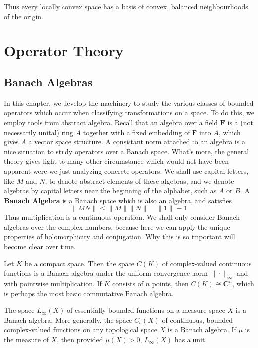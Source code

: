 Thus every locally convex space has a basis of convex, balanced neighbourhoods of the origin.




\part{Operator Theory}





\chapter{Banach Algebras}

In this chapter, we develop the machinery to study the various classes of bounded operators which occur when classifying transformations on a space. To do this, we employ tools from abstract algebra. Recall that an algebra over a field $\mathbf{F}$ is a (not necessarily unital) ring $A$ together with a fixed embedding of $\mathbf{F}$ into $A$, which gives $A$ a vector space structure. A consistant norm attached to an algebra is a nice situation to study operators over a Banach space. What's more, the general theory gives light to many other circumstance  which would not have been apparent were we just analyzing concrete operators. We shall use capital letters, like $M$ and $N$, to denote abstract elements of these algebras, and we denote algebras by capital letters near the beginning of the alphabet, such as $A$ or $B$. A {\bf Banach Algebra} is a Banach space which is also an algebra, and satisfies
%
\begin{equation} \label{algebranorm} \| MN \| \leq \| M \| \| N \|\ \ \ \ \ \| 1 \| = 1 \end{equation}
%
Thus multiplication is a continuous operation. We shall only consider Banach algebras over the complex numbers, because here we can apply the unique properties of holomorphicity and conjugation. Why this is so important will become clear over time.

\begin{example}
    Let $K$ be a compact space. Then the space $C(K)$ of complex-valued continuous functions is a Banach algebra under the uniform convergence norm $\| \cdot \|_\infty$ and with pointwise multiplication. If $K$ consists of $n$ points, then $C(K) \cong \mathbf{C}^n$, which is perhaps the most basic commutative Banach algebra.
\end{example}

\begin{example}
    The space $L_\infty(X)$ of essentially bounded functions on a measure space $X$ is a Banach algebra. More generally, the space $C_b(X)$ of continuous, bounded complex-valued functions on any topological space $X$ is a Banach algebra. If $\mu$ is the measure of $X$, then provided $\mu(X) > 0$, $L_\infty(X)$ has a unit.
\end{example}

